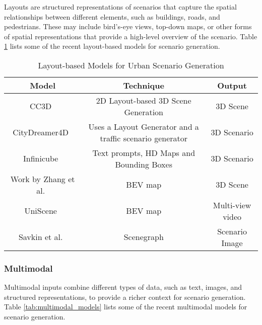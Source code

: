\documentclass{article}
\begin{document}
Layouts are structured representations of scenarios that capture the spatial relationships between different elements, such as buildings, roads, and pedestrians. These may include bird's-eye views, top-down maps, or other forms of spatial representations that provide a high-level overview of the scenario. Table \ref{tab:layout_based_models} lists some of the recent layout-based models for scenario generation.

\begin{table}[ht]
\centering
    \begin{tabular}{|c|c|c|}
    \hline
    \textbf{Model} & \textbf{Technique} & \textbf{Output} \\ \hline
    CC3D~\cite{bahmani2023cc3d} & 2D Layout-based 3D Scene Generation & 3D Scene \\ \hline
    CityDreamer4D~\cite{xie2025citydreamer4d} & Uses a Layout Generator and a traffic scenario generator & 3D Scenario \\ \hline
    Infinicube~\cite{lu2024infinicube} & Text prompts, HD Maps and Bounding Boxes & 3D Scenario \\ \hline
    Work by Zhang et al.~\cite{urbandiff} & BEV map & 3D Scene \\ \hline
    UniScene~\cite{li2025uniscene} & BEV map & Multi-view video \\ \hline
    Savkin et al.~\cite{savkin2021unsupervised} & Scenegraph & Scenario Image \\ \hline
    \end{tabular}
\caption{Layout-based Models for Urban Scenario Generation}
\label{tab:layout_based_models}
\end{table}

\subsubsection{Multimodal}

Multimodal inputs combine different types of data, such as text, images, and structured representations, to provide a richer context for scenario generation. Table \ref{tab:multimodal_models} lists some of the recent multimodal models for scenario generation.
\end{document}
